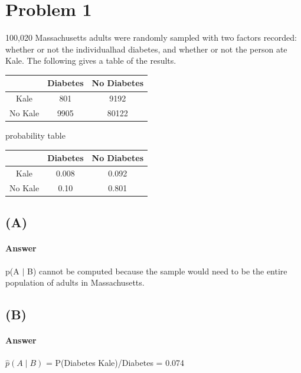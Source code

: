\documentclass[12pt]{article}
\begin{document}
\maketitle

\section*{Problem 1}
100,020 Massachusetts adults were randomly sampled with two factors recorded:  whether or not the individualhad diabetes, and whether or not the person ate Kale.  The following gives a table of the results.
\begin{center}
	\begin{tabular}{c c c} 
		\hline
		\space & Diabetes & No Diabetes \\ 
		\hline
		Kale& 801 & 9192 \\ 
		\hline
		No Kale & 9905 & 80122 \\ 
		\hline
	\end{tabular}
\end{center}
\begin{center}
probability table\\
\begin{tabular}{c c c} 
	\hline
	\space & Diabetes & No Diabetes \\ 
	\hline
	Kale& 0.008 & 0.092 \\ 
	\hline
	No Kale & 0.10 & 0.801 \\ 
	\hline
\end{tabular}
\end{center}
\subsection*{(A)}

\paragraph{Answer}
p(A $\mid$ B) cannot be computed because the sample would need to be the entire population of adults in Massachusetts.

\subsection*{(B)}

\paragraph{Answer}
$\hat{p}(A \mid B)$ = P(Diabetes Kale)/Diabetes  = 0.074
\end{document}
